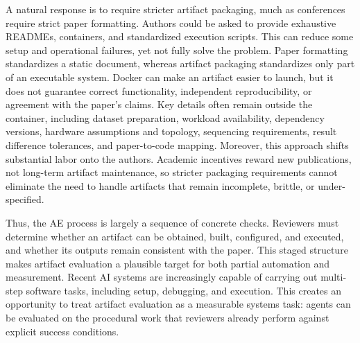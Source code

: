 A natural response is to require stricter artifact packaging, much as conferences require strict paper formatting. Authors could be asked to provide exhaustive READMEs, containers, and standardized execution scripts. This can reduce some setup and operational failures, yet not fully solve the problem. Paper formatting standardizes a static document, whereas artifact packaging standardizes only part of an executable system. Docker can make an artifact easier to launch, but it does not guarantee correct functionality, independent reproducibility, or agreement with the paper's claims. Key details often remain outside the container, including dataset preparation, workload availability, dependency versions, hardware assumptions and topology, sequencing requirements, result difference tolerances, and paper-to-code mapping. Moreover, this approach shifts substantial labor onto the authors. Academic incentives reward new publications, not long-term artifact maintenance, so stricter packaging requirements cannot eliminate the need to handle artifacts that remain incomplete, brittle, or under-specified.

Thus, the AE process is largely a sequence of concrete checks. Reviewers must determine whether an artifact can be obtained, built, configured, and executed, and whether its outputs remain consistent with the paper. This staged structure makes artifact evaluation a plausible target for both partial automation and measurement. Recent AI systems are increasingly capable of carrying out multi-step software tasks, including setup, debugging, and execution. This creates an opportunity to treat artifact evaluation as a measurable systems task: agents can be evaluated on the procedural work that reviewers already perform against explicit success conditions.

